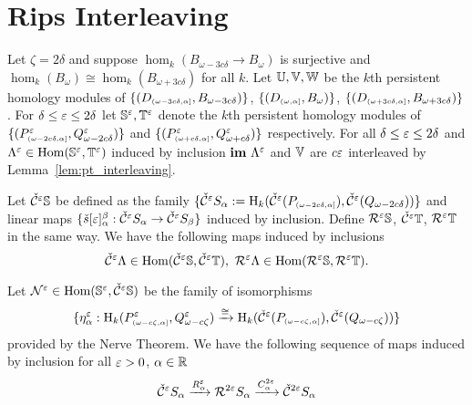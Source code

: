 
\section{Rips Interleaving}

%

Let $\zeta=2\delta$ and suppose $\hom_k(B_{\omega-3c\delta}\to B_\omega)$ is surjective and $\hom_k(B_\omega)\cong\hom_k(B_{\omega+3c\delta})$ for all $k$.
Let $\U, \V, \W$ be the $k$th persistent homology modules of $\{(D\subi{\omega-3c\of, \alpha}, B_{\omega-3c\of})\}$, $\{(D\subi{\omega,\alpha}, \B)\}$, $\{(D\subi{\omega+3c\of,\alpha}, B_{\omega+3c\of})\}$.
For $\delta\leq\e\leq 2\delta$ let $\S^\e, \T^\e$ denote the $k$th persistent homology modules of $\{(P^\e\subi{\omega-2c\of,\alpha},Q_{\omega-2c\of}^\e)\}$ and $\{(P^\e\subi{\omega+c\of,\alpha},\QQ^\e)\}$ respectively.
For all $\delta\leq\e\leq 2\delta$ and $\Lambda^\e\in\Hom(\S^\e, \T^\e)$ induced by inclusion $\im~\Lambda^\e$ and $\V$ are $c\e$ interleaved by Lemma~\ref{lem:pt_interleaving}.


Let $\cech^\e\S$ be defined as the family $\{\cech^\e S_\alpha := \hom_k(\cech^\e(P\subi{\omega-2c\delta, \alpha}), \cech^\e(Q_{\omega-2c\delta}))\}$ and linear maps $\{\check{s}[\e]_\alpha^\beta : \cech^\e S_\alpha\to \cech^\e S_\beta\}$ induced by inclusion.
Define $\rips^\e\S$, $\cech^\e\T$, $\rips^\e\T$ in the same way.
We have the following maps induced by inclusions
\[ \cech^\e\Lambda\in\Hom(\cech^\e\S,\cech^\e\T),\ \rips^\e\Lambda\in\Hom(\rips^\e\S,\rips^\e\T).\]

Let $\N^\e \in\Hom(\S^\e,\cech^\e\S)$ be the family of isomorphisms
\[\{\eta_\alpha^\e : \hom_k(P\subi{\omega-c\zeta,\alpha}^\e, \Q^\e)\xrightarrow{\cong}\hom_k(\cech^\e(P\subi{\omega-c\zeta,\alpha}),\cech^\e(\Q))\}\]
provided by the Nerve Theorem.
We have the following sequence of maps induced by inclusion for all $\e > 0$, $\alpha\in\R$
\[ \cech^\e S_\alpha\xrightarrow{R_\alpha^\e} \rips^{2\e} S_\alpha\xrightarrow{C_\alpha^{2\e}}\cech^{2\e} S_\alpha \]

